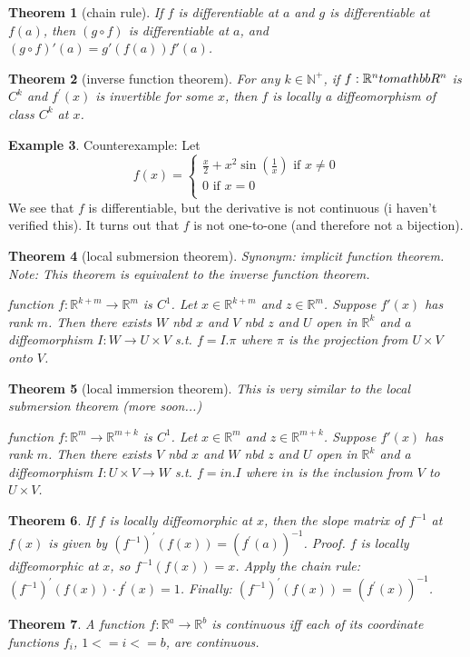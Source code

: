 \documentclass[11pt,leqno,oneside]{amsart}
\newcommand{\R}{{\mathbb R}} %
\newtheorem{thm}{Theorem}[section]
\theoremstyle{definition}
\newtheorem{example}[thm]{Example}
\numberwithin{equation}{section}
\begin{document}
\begin{thm}[chain rule]
	If $f$ is differentiable at $a$ and $g$ is differentiable at $f(a)$, then $(g \circ f)$ is differentiable at $a$, and $(g \circ f)'(a) = g'(f(a))f'(a)$.
\end{thm}
\begin{thm}[inverse function theorem]
	For any $k \in \mathbb{N}^+$, if $f:\mathbb{R}^n \\to \\mathbb{R}^n$ is $C^k$ and $f^\prime(x)$ is invertible for some $x$, then $f$ is locally a diffeomorphism of class $C^k$ at $x$.
\end{thm}
\begin{example}
	Counterexample: Let $$f(x) =
	\begin{cases}
		\frac x2 + x^2\sin\left(\frac 1x\right) \text{ if $x \neq 0$} \\
		0 \text{ if $x=0$} \\
	\end{cases}
	$$  We see that $f$ is differentiable, but the derivative is not continuous (i haven't verified this).  It turns out that $f$ is not one-to-one (and therefore not a bijection).
\end{example}
\begin{thm}[local submersion theorem]
	Synonym: implicit function theorem.
	Note: This theorem is equivalent to the inverse function theorem.

	function $f : \R^{k+m} \to \R^m$ is $C^1$.
	Let $x \in \R^{k+m}$ and $z \in \R^m$.
	Suppose $f'(x)$ has rank $m$.
	Then there exists $W$ nbd $x$ and $V$ nbd $z$ and $U$ open in $\R^k$ and a diffeomorphism $I : W \to U \times V$
	s.t. $f = I.\pi$ where $\pi$ is the projection from $U \times V$ onto $V$.

\end{thm}
\begin{thm}[local immersion theorem]
	This is very similar to the local submersion theorem (more soon...)

	function $f : \R^{m} \to \R^{m+k}$ is $C^1$.
	Let $x \in \R^{m}$ and $z \in \R^{m+k}$.
	Suppose $f'(x)$ has rank $m$.
	Then there exists $V$ nbd $x$ and $W$ nbd $z$ and $U$ open in $\R^k$ and a diffeomorphism $I : U \times V \to W$
	s.t. $f = in.I$ where $in$ is the inclusion from $V$ to $U \times V$.

\end{thm}
\begin{thm}
	If $f$ is locally diffeomorphic at $x$, then the slope matrix of $f^{-1}$ at $f(x)$ is given by $(f^{-1})^\prime(f(x)) = (f^\prime(a))^{-1}$.
	Proof. $f$ is locally diffeomorphic at $x$, so $f^{-1}(f(x)) = x$.
	Apply the chain rule: $(f^{-1})^\prime(f(x)) \cdot f^\prime(x) = 1$.
	Finally: $(f^{-1})^\prime(f(x)) = (f^\prime(x))^{-1}$.
\end{thm}
\begin{thm}
	A function $f : \R^a \to \R^b$ is continuous iff each of its coordinate functions $f_i$, $1<= i <=b$, are continuous.
\end{thm}
\end{document}
